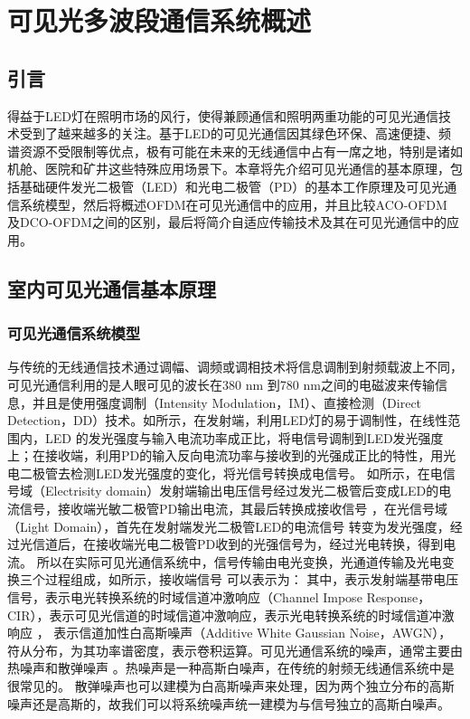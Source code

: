 \chapter{可见光多波段通信系统概述}
\section{引言}
得益于LED灯在照明市场的风行，使得兼顾通信和照明两重功能的可见光通信技术受到了越来越多的关注。基于LED的可见光通信因其绿色环保、高速便捷、频谱资源不受限制等优点，极有可能在未来的无线通信中占有一席之地，特别是诸如机舱、医院和矿井这些特殊应用场景下。本章将先介绍可见光通信的基本原理，包括基础硬件发光二极管（LED）和光电二极管（PD）的基本工作原理及可见光通信系统模型，然后将概述OFDM在可见光通信中的应用，并且比较ACO-OFDM 及DCO-OFDM之间的区别，最后将简介自适应传输技术及其在可见光通信中的应用。
\section{室内可见光通信基本原理}
\subsection{可见光通信系统模型}
与传统的无线通信技术通过调幅、调频或调相技术将信息调制到射频载波上不同，可见光通信利用的是人眼可见的波长在380 nm 到780 nm之间的电磁波来传输信息，并且是使用强度调制（Intensity Modulation，IM）、直接检测（Direct Detection，DD）技术。如所示，在发射端，利用LED灯的易于调制性，在线性范围内，LED 的发光强度与输入电流功率成正比，将电信号调制到LED发光强度上；在接收端，利用PD的输入反向电流功率与接收到的光强成正比的特性，用光电二极管去检测LED发光强度的变化，将光信号转换成电信号。
如所示，在电信号域（Electrisity domain）发射端输出电压信号经过发光二极管后变成LED的电流信号，接收端光敏二极管PD输出电流，其最后转换成接收信号 ，在光信号域（Light Domain），首先在发射端发光二极管LED的电流信号 转变为发光强度，经过光信道后，在接收端光电二极管PD收到的光强信号为，经过光电转换，得到电流。
所以在实际可见光通信系统中，信号传输由电光变换，光通道传输及光电变换三个过程组成，如所示，接收端信号 可以表示为：
其中，表示发射端基带电压信号，表示电光转换系统的时域信道冲激响应（Channel Impose Response，CIR），表示可见光信道的时域信道冲激响应，表示光电转换系统的时域信道冲激响应
\cite{Yangxuecheng2015}，
表示信道加性白高斯噪声（Additive White Gaussian Noise，AWGN），符从分布，为其功率谱密度，表示卷积运算。可见光通信系统的噪声，通常主要由热噪声和散弹噪声
\cite{Chenchunyan2014}。热噪声是一种高斯白噪声，在传统的射频无线通信系统中是很常见的。
散弹噪声也可以建模为白高斯噪声来处理，因为两个独立分布的高斯噪声还是高斯的，故我们可以将系统噪声统一建模为与信号独立的高斯白噪声。


